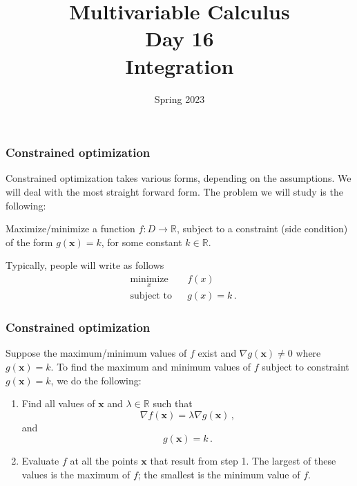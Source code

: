 \documentclass[aspectratio=169]{beamer}
\title{ Multivariable Calculus \\ Day  16\\ Integration }
\date{Spring 2023}
\begin{document}
\maketitle

\begin{frame}
    \frametitle{Constrained optimization}
Constrained optimization takes various forms, depending on the assumptions.
We will deal with the most straight forward form.
The problem we will study is the following:

Maximize/minimize a function \(f:D\to \mathbb{R}\), subject to a constraint (side condition)
of the form
\(g(\mathbf{x}) = k\), for some constant \(k\in \mathbb{R}\).


Typically, people will write as follows
\begin{equation*}
\begin{aligned}
& \underset{x}{\text{minimize}}
& & f(x) \\
& \text{subject to}
& & 
g(x) = k \,.
\end{aligned}
\end{equation*}
\end{frame}

\begin{frame}
    \frametitle{Constrained optimization}
    
\begin{theorem}

Suppose the maximum/minimum values of \(f\) exist and \(\nabla g(\mathbf{x}) \not=0\) where \(g(\mathbf{x}) = k\).
To find the maximum and minimum values of \(f\) subject to constraint
\(g(\mathbf{x}) = k\), we do the following:

\begin{enumerate}
\def\labelenumi{\arabic{enumi}.}
\item
  Find all values of \(\mathbf{x}\) and \(\lambda \in \mathbb{R}\) such that
  \begin{equation*}
   \nabla f(\mathbf{x}) =\lambda \nabla g(\mathbf{x})\,,
  \end{equation*}
  and
  \begin{equation*}
   g(\mathbf{x}) = k \,.
  \end{equation*}
\item
  Evaluate \(f\) at all the points \(\mathbf{x}\) that result from step 1. The largest of
  these values is the maximum of \(f\); the smallest is the minimum value of \(f\).
\end{enumerate}

\end{theorem}
\end{frame}
\end{document}

